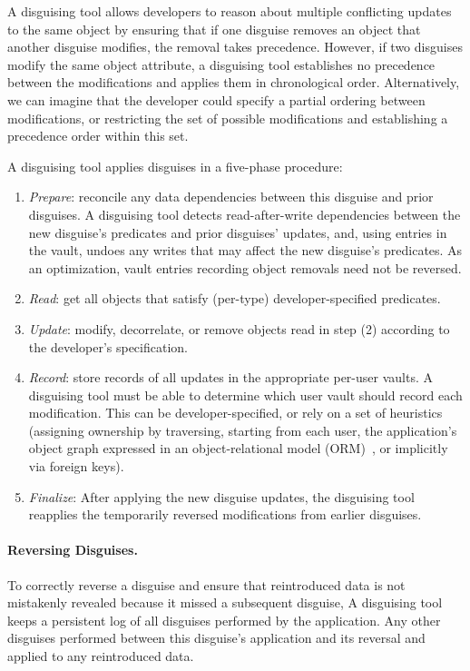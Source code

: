 A disguising tool allows developers to reason about multiple conflicting updates to the same object by ensuring that
if one disguise removes an object that another disguise modifies, the removal takes
precedence.
%
However, if two disguises modify the same object attribute, a disguising tool
establishes no precedence between the modifications and applies them in chronological order.
Alternatively, we can imagine that the developer could specify a partial ordering between
modifications, or restricting the set of possible modifications and establishing a precedence order
within this set.

A disguising tool applies disguises in a five-phase procedure:
\begin{enumerate}[nosep]
    \item \emph{Prepare}: reconcile any data dependencies between this disguise and prior disguises.
            A disguising tool detects read-after-write dependencies between the new disguise's predicates and prior disguises'
            updates, and, using entries in the vault, undoes any writes that may affect the new disguise's predicates. As an
            optimization, vault entries recording object removals need not be reversed.
        \item \emph{Read}: get all objects that satisfy (per-type) developer-specified predicates.
        \item \emph{Update}: modify, decorrelate, or remove objects read in step (2) according to the
        developer's specification.
    \item \emph{Record}: store records of all updates in the appropriate per-user vaults. A
        disguising tool
        must be able to determine which user vault should record each modification. This can be
        developer-specified, or rely on a set of heuristics (\eg assigning ownership by traversing,
        starting from each user, the application's object graph expressed in an object-relational
        model (ORM)~\cite{orm}, or implicitly via foreign keys).
        \item \emph{Finalize}: After applying the new disguise updates, the disguising tool reapplies the temporarily reversed modifications from earlier disguises.
\end{enumerate}

\paragraph{Reversing Disguises.}
To correctly reverse a disguise and ensure that reintroduced data is not mistakenly revealed because
it missed a subsequent disguise, A disguising tool keeps a persistent log of all disguises performed by the
application. Any other disguises performed between this disguise's application and its reversal and
applied to any reintroduced data.
